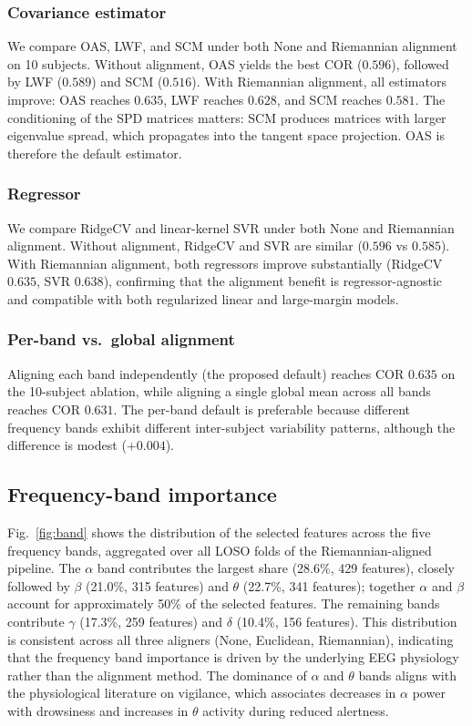 \documentclass[journal,twoside,web]{ieeecolor2}
\begin{document}
\subsubsection{Covariance estimator} We compare OAS, LWF, and SCM under
both None and Riemannian alignment on 10 subjects. Without alignment,
OAS yields the best COR ($0.596$), followed by LWF ($0.589$) and SCM
($0.516$). With Riemannian alignment, all estimators improve: OAS
reaches $0.635$, LWF reaches $0.628$, and SCM reaches $0.581$. The
conditioning of the SPD matrices matters: SCM produces matrices with
larger eigenvalue spread, which propagates into the tangent space
projection. OAS is therefore the default estimator.

\subsubsection{Regressor} We compare RidgeCV and linear-kernel SVR under
both None and Riemannian alignment. Without alignment, RidgeCV and
SVR are similar ($0.596$ vs $0.585$). With Riemannian alignment, both
regressors improve substantially (RidgeCV $0.635$, SVR $0.638$),
confirming that the alignment benefit is regressor-agnostic and
compatible with both regularized linear and large-margin models.

\subsubsection{Per-band vs.\ global alignment} Aligning each band
independently (the proposed default) reaches COR $0.635$ on the
10-subject ablation, while aligning a single global mean across all
bands reaches COR $0.631$. The per-band default is preferable because
different frequency bands exhibit different inter-subject variability
patterns, although the difference is modest ($+0.004$).

\subsection{Frequency-band importance}

Fig.~\ref{fig:band} shows the distribution of the selected
features across the five frequency bands, aggregated over all
LOSO folds of the Riemannian-aligned pipeline. The $\alpha$ band
contributes the largest share (28.6\%, 429 features), closely followed by
$\beta$ (21.0\%, 315 features) and $\theta$ (22.7\%, 341 features);
together $\alpha$ and $\beta$ account for
approximately 50\% of the selected features. The remaining bands
contribute $\gamma$ (17.3\%, 259 features) and $\delta$
(10.4\%, 156 features). This distribution is consistent across all three
aligners (None, Euclidean, Riemannian), indicating that the frequency
band importance is driven by the underlying EEG physiology rather than
the alignment method. The dominance of $\alpha$ and $\theta$ bands
aligns with the physiological literature on vigilance, which
associates decreases in $\alpha$ power with drowsiness and increases
in $\theta$ activity during reduced alertness.
\end{document}
